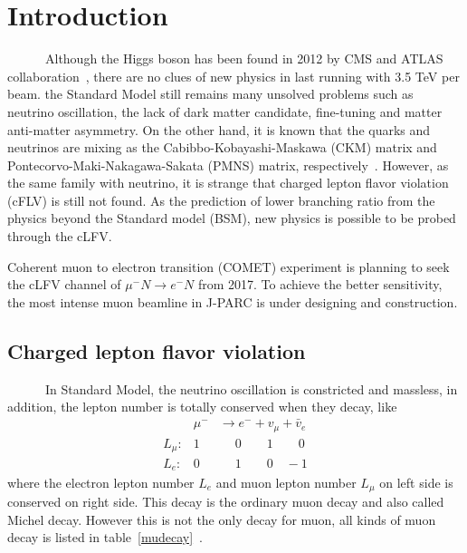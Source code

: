 \chapter{Introduction}
~~~~~~Although the Higgs boson has been found in 2012 by CMS and ATLAS collaboration~\cite{higgs}, there are no clues of new physics in last running with 3.5 TeV per beam.
the Standard Model still remains many unsolved problems such as neutrino oscillation, the lack of dark matter candidate, fine-tuning and matter anti-matter asymmetry.
On the other hand, it is known that the quarks and neutrinos are mixing as the Cabibbo-Kobayashi-Maskawa (CKM) matrix and Pontecorvo-Maki-Nakagawa-Sakata (PMNS) matrix, respectively~\cite{mark}.
However, as the same family with neutrino, it is strange that charged lepton flavor violation (cFLV) is still not found.
As the prediction of lower branching ratio from the physics beyond the Standard model (BSM), new physics is possible to be probed through the cLFV.

Coherent muon to electron transition (COMET) experiment is planning to seek the cLFV channel of $\mu^- N \rightarrow e^- N$ from 2017.
To achieve the better sensitivity, the most intense muon beamline in J-PARC is under designing and construction.

\section{Charged lepton flavor violation}
~~~~~~In Standard Model, the neutrino oscillation is constricted and massless, in addition, the lepton number is totally conserved when they decay, like
\begin{eqnarray*}
 & \mu^- & \rightarrow  e^-  +  v_\mu  +  \bar v_e  \\
 L_\mu: & 1 & \quad\; 0 \qquad 1 \qquad\! 0 \\
 L_e: & 0 &   \quad\; 1 \qquad 0 \quad -1 
\end{eqnarray*}
where the electron lepton number $L_e$ and muon lepton number $L_\mu$ on left side is conserved on right side.
This decay is the ordinary muon decay and also called Michel decay.
However this is not the only decay for muon, all kinds of muon decay is listed in table~\ref{mudecay}~\cite{pdg}.

